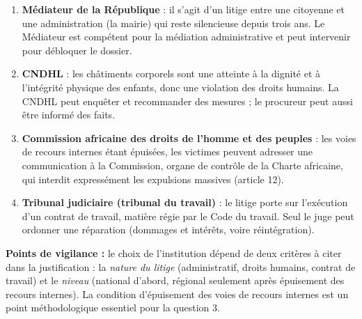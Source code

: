 \documentclass[11pt]{article}
\begin{document}
\begin{corrige}
\begin{enumerate}
\item \textbf{Médiateur de la République} : il s'agit d'un litige entre une citoyenne et une administration (la mairie) qui reste silencieuse depuis trois ans. Le Médiateur est compétent pour la médiation administrative et peut intervenir pour débloquer le dossier.
\item \textbf{CNDHL} : les châtiments corporels sont une atteinte à la dignité et à l'intégrité physique des enfants, donc une violation des droits humains. La CNDHL peut enquêter et recommander des mesures ; le procureur peut aussi être informé des faits.
\item \textbf{Commission africaine des droits de l'homme et des peuples} : les voies de recours internes étant épuisées, les victimes peuvent adresser une communication à la Commission, organe de contrôle de la Charte africaine, qui interdit expressément les expulsions massives (article 12).
\item \textbf{Tribunal judiciaire (tribunal du travail)} : le litige porte sur l'exécution d'un contrat de travail, matière régie par le Code du travail. Seul le juge peut ordonner une réparation (dommages et intérêts, voire réintégration).
\end{enumerate}

\textbf{Points de vigilance :} le choix de l'institution dépend de deux critères à citer dans la justification : la \emph{nature du litige} (administratif, droits humains, contrat de travail) et le \emph{niveau} (national d'abord, régional seulement après épuisement des recours internes). La condition d'épuisement des voies de recours internes est un point méthodologique essentiel pour la question 3.
\end{corrige}
\end{document}
